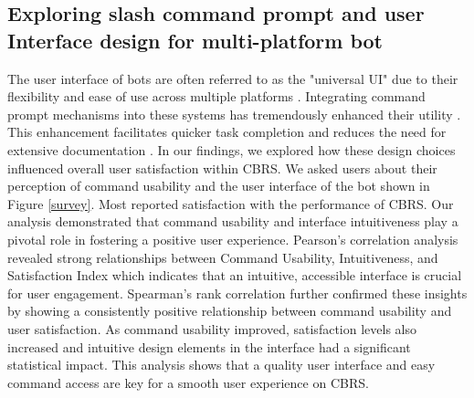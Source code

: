 \documentclass[11pt]{article}
\begin{document}
\subsection{Exploring slash command prompt and user Interface design for multi-platform bot}
The user interface of bots are often referred to as the "universal UI" due to their flexibility and ease of use across multiple platforms \cite{31santhanam2022bots}. Integrating command prompt mechanisms into these systems has tremendously enhanced their utility \cite{31santhanam2022bots}. This enhancement facilitates quicker task completion and reduces the need for extensive documentation \cite{31santhanam2022bots}. In our findings, we explored how these design choices influenced overall user satisfaction within CBRS. We asked users about their perception of command usability and the user interface of the bot shown in Figure \ref{survey}. Most reported satisfaction with the performance of CBRS. Our analysis demonstrated that command usability and interface intuitiveness play a pivotal role in fostering a positive user experience. Pearson’s correlation analysis revealed strong relationships between Command Usability, Intuitiveness, and Satisfaction Index which indicates that an intuitive, accessible interface is crucial for user engagement. Spearman’s rank correlation further confirmed these insights by showing a consistently positive relationship between command usability and user satisfaction. As command usability improved, satisfaction levels also increased and intuitive design elements in the interface had a significant statistical impact. This analysis shows that a quality user interface and easy command access are key for a smooth user experience on CBRS.
\end{document}
